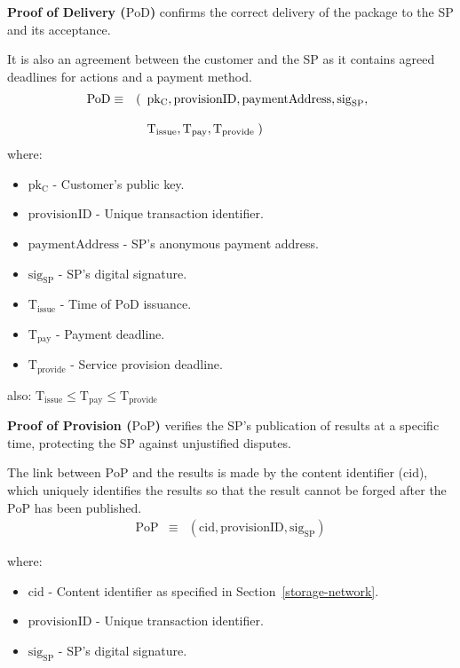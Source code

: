 \documentclass[pdftex,twocolumn,epjc3]{svjour3}
\begin{document}
\noindent \textbf{Proof of Delivery ($\mathrm{PoD}$)}\label{proof-of-delivery} confirms the correct delivery of the package to the SP and its acceptance.

It is also an agreement between the customer and the SP as it contains agreed deadlines for actions and a payment method.
\begin{eqnarray*}
\mathrm{PoD} & \equiv & (\begin{array}[t]{l}\mathrm{pk_C}, \mathrm{provisionID},   \mathrm{paymentAddress},
\mathrm{sig}_\mathrm{SP}, \\\\ 
\mathrm{T}_\mathrm{issue}, \mathrm{T}_\mathrm{pay}, \mathrm{T}_\mathrm{provide}\; )\end{array}
\end{eqnarray*}
where:
\begin{itemize}
\item $\mathrm{pk_C}$ - Customer's public key.
\item $\mathrm{provisionID}$ - Unique transaction identifier.
\item $\mathrm{paymentAddress}$ - SP's anonymous payment address.
\item $\mathrm{sig}_\mathrm{SP}$ - SP's digital signature.
\item $\mathrm{T}_\mathrm{issue}$ - Time of $\mathrm{PoD}$ issuance.
\item $\mathrm{T}_\mathrm{pay}$ - Payment deadline.
\item $\mathrm{T}_\mathrm{provide}$ - Service provision deadline.
\end{itemize}

also:
\(\mathrm{T}_\mathrm{issue} \leq \mathrm{T}_\mathrm{pay} \leq \mathrm{T}_\mathrm{provide}\)

\noindent \textbf{Proof of Provision ($\mathrm{PoP}$)}\label{proof-of-provision} verifies the SP's publication of results at a specific time, protecting the SP against unjustified disputes.

The link between $\mathrm{PoP}$ and the results is made by the content identifier ($\mathrm{cid}$), which uniquely identifies the results so that the result cannot be forged after the $\mathrm{PoP}$ has been published.
\begin{eqnarray*}
\mathrm{PoP} & \equiv & (\mathrm{cid}, \mathrm{provisionID}, \mathrm{sig}_\mathrm{SP})
\end{eqnarray*}

where:
\begin{itemize}
\item $\mathrm{cid}$ - Content identifier as specified in Section~\ref{storage-network}.
\item $\mathrm{provisionID}$ - Unique transaction identifier.
\item $\mathrm{sig}_\mathrm{SP}$ - SP's digital signature.
\end{itemize}
\end{document}
